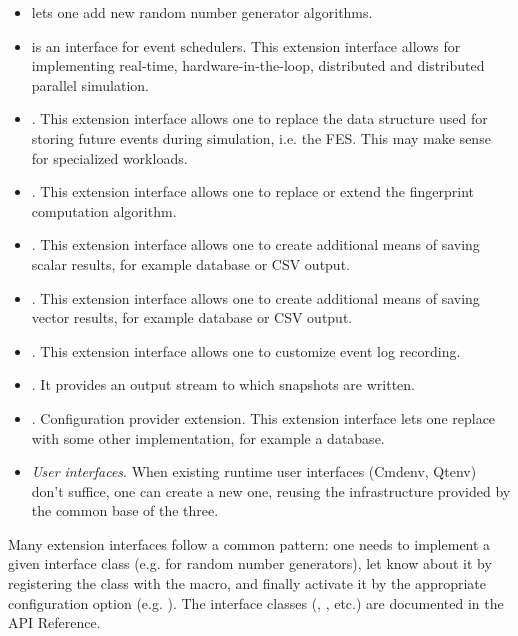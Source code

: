 \begin{itemize}
   \item {} lets one add new random number generator algorithms.
   \item {} is an interface for event schedulers.
     This extension interface allows for implementing real-time,
     hardware-in-the-loop, distributed and distributed parallel simulation.
   \item {}. This extension interface allows one to
     replace the data structure used for storing future events during
     simulation, i.e. the FES. This may make sense for specialized
     workloads.
   \item {}. This extension interface allows one
     to replace or extend the fingerprint computation algorithm.
   \item {}. This extension interface allows
     one to create additional means of saving scalar results, for example
     database or CSV output.
   \item {}. This extension interface allows
     one to create additional means of saving vector results, for example
     database or CSV output.
   \item {}. This extension interface allows one
     to customize event log recording.
   \item {}. It provides an output stream to which
     snapshots are written.
   \item {}. Configuration provider extension.
     This extension interface lets one replace 
     with some other implementation, for example a database.
   \item \textit{User interfaces}. When existing runtime user interfaces
     (Cmdenv, Qtenv) don't suffice, one can create a new one,
     reusing the infrastructure provided by the common base of the three.
\end{itemize}

Many extension interfaces follow a common pattern: one needs to implement a
given interface class (e.g.  for random number generators),
let {\opp} know about it by registering the class with the
 macro, and finally activate it by the appropriate
configuration option (e.g. ). The interface classes
(, , etc.) are documented in the API
Reference.

